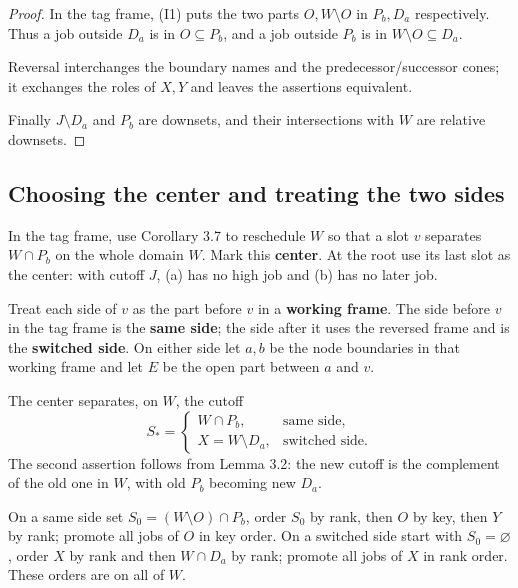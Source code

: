 \begin{proof}
In the tag frame, (I1) puts the two parts \(O,W\setminus O\) in \(P_b,D_a\) respectively. Thus a job outside \(D_a\) is in \(O\subseteq P_b\), and a job outside \(P_b\) is in \(W\setminus O\subseteq D_a\).

Reversal interchanges the boundary names and the predecessor/successor cones; it exchanges the roles of \(X,Y\) and leaves the assertions equivalent.

Finally \(J\setminus D_a\) and \(P_b\) are downsets, and their intersections with \(W\) are relative downsets.
\end{proof}

\subsection{Choosing the center and treating the two sides}

In the tag frame, use Corollary 3.7 to reschedule \(W\) so that a slot \(v\) separates \(W\cap P_b\) on the whole domain \(W\). Mark this \textbf{center}. At the root use its last slot as the center: with cutoff \(J\), (a) has no high job and (b) has no later job.

Treat each side of \(v\) as the part before \(v\) in a \textbf{working frame}. The side before \(v\) in the tag frame is the \textbf{same side}; the side after it uses the reversed frame and is the \textbf{switched side}. On either side let \(a,b\) be the node boundaries in that working frame and let \(E\) be the open part between \(a\) and \(v\).

The center separates, on \(W\), the cutoff \[
S_*=
\begin{cases}
W\cap P_b,&\text{same side},\\
X=W\setminus D_a,&\text{switched side}.
\end{cases}
\tag{4.3}
\] The second assertion follows from Lemma 3.2: the new cutoff is the complement of the old one in \(W\), with old \(P_b\) becoming new \(D_a\).

On a same side set \(S_0=(W\setminus O)\cap P_b\), order \(S_0\) by rank, then \(O\) by key, then \(Y\) by rank; promote all jobs of \(O\) in key order. On a switched side start with \(S_0=\varnothing\), order \(X\) by rank and then \(W\cap D_a\) by rank; promote all jobs of \(X\) in rank order. These orders are on all of \(W\).

